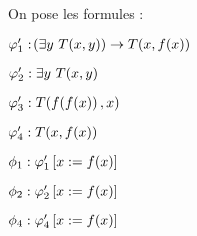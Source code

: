 \documentclass[a4paper,french,bookmarks]{book}
\begin{document}
    \begin{landscape}
    On pose les formules :
    \begin{enumerate}
        \begin{minipage}{0.48\linewidth}
            \itt $\varphi_1' : \!\left(\exists y \ T\!\left(x, y\right)\right) \to T\!\left(x, f\!\left(x\right)\right)$
                
            \itt $\varphi_2' : \exists y \ T\!\left(x, y\right)$
                
            \itt $\varphi_3' : T\!\left(f\!\left(f\!\left(x\right)\right), x\right)$
                
            \itt $\varphi_4' : T\!\left(x, f\!\left(x\right)\right)$
        \end{minipage}
        \hfill
        \begin{minipage}{0.48\linewidth}
            \itt $\phi_1 : \varphi_1'\left[x := f\!\left(x\right)\right]$
            
            \itt $\phi_2 : \varphi_2' \left[x := f\!\left(x\right)\right]$
            
            \itt $\phi_4 : \varphi_4'\left[x := f\!\left(x\right)\right]$
        \end{minipage}
                

\end{enumerate}
\end{landscape}
\end{document}
